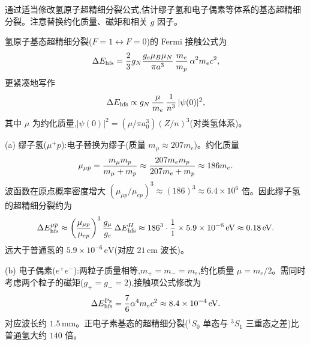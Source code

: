 \begin{question}
通过适当修改氢原子超精细分裂公式,估计缪子氢和电子偶素等体系的基态超精细分裂。注意替换约化质量、磁矩和相关 $g$ 因子。
\end{question}
\begin{solution}
氢原子基态超精细分裂($F=1\leftrightarrow F=0$)的 Fermi 接触公式为
\[
\Delta E_{\rm hfs} = {2\over3}g_N{g_e\mu_B\mu_N\over\pi a^3}\,{m_e\over m_p}\,\alpha^2 m_e c^2,
\]
更紧凑地写作
\[
\Delta E_{\rm hfs} \propto g_N\,{\mu\over m_e}\,{1\over n^3}\,|\psi(0)|^2,
\]
其中 $\mu$ 为约化质量,$|\psi(0)|^2=(\mu/\pi a_0^3)(Z/n)^3$(对类氢体系)。

(a) 缪子氢($\mu^+p$):电子替换为缪子(质量 $m_\mu\approx207 m_e$)。约化质量
\[
\mu_{\mu p} = {m_\mu m_p\over m_\mu+m_p} \approx {207 m_e m_p\over 207 m_e+m_p} \approx 186 m_e.
\]
波函数在原点概率密度增大 $(\mu_{\mu p}/\mu_{ep})^3 \approx (186)^3 \approx 6.4\times10^6$ 倍。因此缪子氢的超精细分裂约为
\[
\Delta E_{\rm hfs}^{\mu p} \approx \left({\mu_{\mu p}\over\mu_{ep}}\right)^3 {g_\mu\over g_e}\,\Delta E_{\rm hfs}^{H} \approx 186^3\cdot{1\over1}\times 5.9\times10^{-6}\,\mathrm{eV} \approx 0.18\,\mathrm{eV}.
\]
远大于普通氢的 $5.9\times10^{-6}\,\mathrm{eV}$(对应 $21\,\mathrm{cm}$ 波长)。

(b) 电子偶素($e^+e^-$):两粒子质量相等,$m_+=m_-=m_e$,约化质量 $\mu=m_e/2$。需同时考虑两个粒子的磁矩($g_+=g_-=2$),接触项公式修改为
\[
\Delta E_{\rm hfs}^{\rm Ps} = {7\over6}\alpha^4 m_e c^2 \approx 8.4\times10^{-4}\,\mathrm{eV}.
\]
对应波长约 $1.5\,\mathrm{mm}$。正电子素基态的超精细分裂($^1S_0$ 单态与 $^3S_1$ 三重态之差)比普通氢大约 $140$ 倍。
\end{solution}

